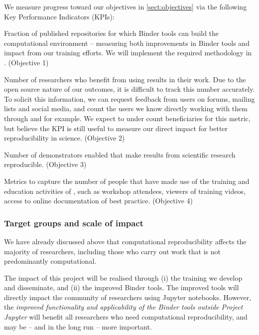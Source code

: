 We measure progress toward our objectives in \ref{sect:objectives}
via the following Key Performance Indicators (KPIs):
\begin{compactenum}
\item \label{kpi:reproducibility} Fraction of published repositories for
  which Binder tools can build the computational environment -- measuring both
  improvements in Binder tools and impact from our training efforts. We will
  implement the required methodology in
  . (Objective 1)
\item \label{kpi:broaden} Number of researchers who benefit from using
  \TheProject{} results in their work. Due to the open source nature of our
  outcomes, it is difficult to track this number accurately. To solicit this
  information, we can request feedback from users on forums, mailing lists and
  social media, and count the users we know directly working with
  them through  and  for example. We expect
  to under count beneficiaries for this metric, but believe the KPI is still useful
  to measure our direct impact for better reproducibility in science. (Objective 2)
\item \label{kpi:demonstrators} Number of demonstrators enabled that make
  results from scientific research reproducible. (Objective 3)
\item \label{kpi:education} Metrics to capture the number of people that have
  made use of the training and education activities of \TheProject{}, such as
  workshop attendees, viewers of training videos, access to online documentation
  of best practice. (Objective 4)%
\end{compactenum}


\subsubsection{Target groups and scale of impact}

We have already discussed above that computational reproducibility affects the
majority of researchers, including those who carry out work that is not
predominantly computational.

The impact of this project will be realised through (i) the training we develop
and disseminate, and (ii) the improved Binder tools. The improved tools will
directly impact the community of researchers using Jupyter notebooks. However,
the \emph{improved functionality and applicability of the Binder tools outside Project
Jupyter} will benefit all researchers who need computational reproducibility, and
may be -- and in the long run -- more important.

